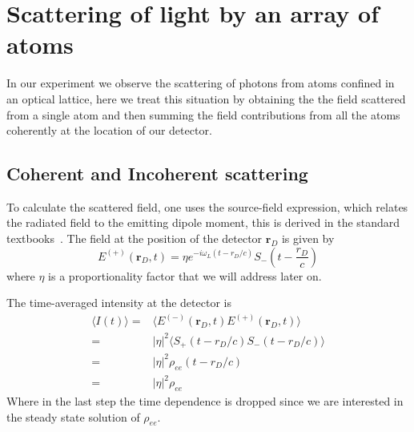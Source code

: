 \documentclass[11pt,letter]{article}
\newcommand{\bv}[1]{\ensuremath{\bm{#1}}}
\begin{document}
\section{Scattering of light by an array of atoms}

In our experiment we observe the scattering of photons from atoms confined in an optical lattice, here we treat this situation by obtaining the the field scattered from a single atom and then summing the field contributions from all the atoms coherently at the location of our detector.  

\subsection{Coherent and Incoherent scattering}

To calculate the scattered field, one uses the source-field expression, which relates the radiated field to the emitting dipole moment, this 
is derived in the standard textbooks~\cite{loudon2000quantum,cohen1998atom}.
The field at the position of the detector $\bv{r}_{D}$ is given by
\begin{equation}
E^{(+)}( \bv{r}_{D}, t) = \eta 
    e^{- i \omega_{L} ( t - r_{D}/c) } S_{-}\left(t - \frac{ r_{D} }{c} \right) 
\end{equation} 
where $\eta$ is a proportionality factor that we will address later on.  

The time-averaged intensity at the detector is 
\begin{equation}
\label{eq:Idef}
\begin{split}
\langle I (t) \rangle = & \langle E^{(-)}(\bv{r}_{D}, t) E^{(+)}(\bv{r}_{D}, t) \rangle \\
          = & |\eta|^{2} \langle S_{+}(t-r_{D}/c)S_{-}(t-r_{D}/c) \rangle  \\
          = & |\eta|^{2} \rho_{ee}( t- r_{D}/c )  \\
          = & |\eta|^{2} \rho_{ee}
\end{split} 
\end{equation}
Where in the last step the time dependence is dropped since we are interested in the steady state solution of $\rho_{ee}$.
\end{document}
